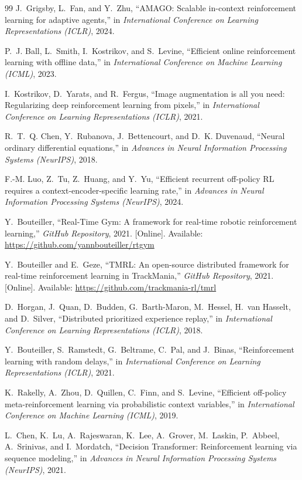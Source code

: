 \documentclass[conference]{IEEEtran}
\begin{document}
\begin{thebibliography}{99}
J.~Grigsby, L.~Fan, and Y.~Zhu, ``AMAGO: Scalable in-context reinforcement learning for adaptive agents,'' in \emph{International Conference on Learning Representations (ICLR)}, 2024.

P.~J. Ball, L.~Smith, I.~Kostrikov, and S.~Levine, ``Efficient online reinforcement learning with offline data,'' in \emph{International Conference on Machine Learning (ICML)}, 2023.

I.~Kostrikov, D.~Yarats, and R.~Fergus, ``Image augmentation is all you need: Regularizing deep reinforcement learning from pixels,'' in \emph{International Conference on Learning Representations (ICLR)}, 2021.

R.~T.~Q. Chen, Y.~Rubanova, J.~Bettencourt, and D.~K. Duvenaud, ``Neural ordinary differential equations,'' in \emph{Advances in Neural Information Processing Systems (NeurIPS)}, 2018.

F.-M. Luo, Z.~Tu, Z.~Huang, and Y.~Yu, ``Efficient recurrent off-policy RL requires a context-encoder-specific learning rate,'' in \emph{Advances in Neural Information Processing Systems (NeurIPS)}, 2024.

Y.~Bouteiller, ``Real-Time Gym: A framework for real-time robotic reinforcement learning,'' \emph{GitHub Repository}, 2021. [Online]. Available: \url{https://github.com/yannbouteiller/rtgym}

Y.~Bouteiller and E.~Geze, ``TMRL: An open-source distributed framework for real-time reinforcement learning in TrackMania,'' \emph{GitHub Repository}, 2021. [Online]. Available: \url{https://github.com/trackmania-rl/tmrl}

D.~Horgan, J.~Quan, D.~Budden, G.~Barth-Maron, M.~Hessel, H.~van Hasselt, and D.~Silver, ``Distributed prioritized experience replay,'' in \emph{International Conference on Learning Representations (ICLR)}, 2018.

Y.~Bouteiller, S.~Ramstedt, G.~Beltrame, C.~Pal, and J.~Binas, ``Reinforcement learning with random delays,'' in \emph{International Conference on Learning Representations (ICLR)}, 2021.

K.~Rakelly, A.~Zhou, D.~Quillen, C.~Finn, and S.~Levine, ``Efficient off-policy meta-reinforcement learning via probabilistic context variables,'' in \emph{International Conference on Machine Learning (ICML)}, 2019.

L.~Chen, K.~Lu, A.~Rajeswaran, K.~Lee, A.~Grover, M.~Laskin, P.~Abbeel, A.~Srinivas, and I.~Mordatch, ``Decision Transformer: Reinforcement learning via sequence modeling,'' in \emph{Advances in Neural Information Processing Systems (NeurIPS)}, 2021.


\end{thebibliography}
\end{document}
